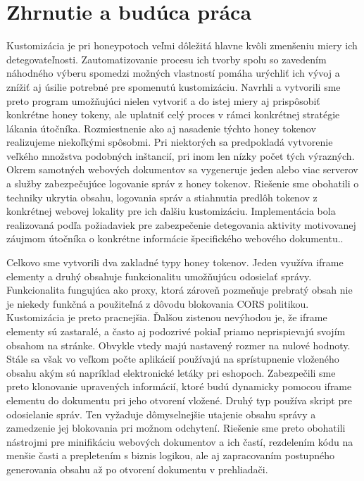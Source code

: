 \documentclass[conference, 11pt,slovak,a4paper,twoside]{IEEEtran}
\begin{document}
\section{Zhrnutie a budúca práca} \label{conclusions}

Kustomizácia je pri honeypotoch veľmi dôležitá hlavne kvôli zmenšeniu miery ich detegovateľnosti. Zautomatizovanie procesu ich tvorby spolu so zavedením náhodného výberu spomedzi možných vlastností pomáha urýchliť ich vývoj a znížiť aj úsilie potrebné pre spomenutú kustomizáciu. Navrhli a vytvorili sme preto program umožňujúci nielen vytvoriť a do istej miery aj prispôsobiť konkrétne honey tokeny, ale uplatniť celý proces v rámci konkrétnej stratégie lákania útočníka. Rozmiestnenie ako aj nasadenie týchto honey tokenov realizujeme niekoľkými spôsobmi. Pri niektorých sa predpokladá vytvorenie veľkého množstva podobných inštancií, pri inom len nízky počet tých výrazných. Okrem samotných webových dokumentov sa vygeneruje jeden alebo viac serverov a služby zabezpečujúce logovanie správ z honey tokenov. Riešenie sme obohatili o techniky ukrytia obsahu, logovania správ a stiahnutia predlôh tokenov z konkrétnej webovej lokality pre ich ďalšiu kustomizáciu. Implementácia bola realizovaná podľa požiadaviek pre zabezpečenie detegovania aktivity motivovanej záujmom útočníka o konkrétne informácie špecifického webového dokumentu..

Celkovo sme vytvorili dva zakladné typy honey tokenov. Jeden využíva iframe elementy a druhý obsahuje funkcionalitu umožňujúcu odosielať správy. Funkcionalita fungujúca ako proxy, ktorá zároveň pozmeňuje prebratý obsah nie je niekedy funkčná a použiteľná z dôvodu blokovania CORS politikou. Kustomizácia je preto pracnejšia. Ďalšou zistenou nevýhodou je, že iframe elementy sú zastaralé, a často aj podozrivé pokiaľ priamo neprispievajú svojím obsahom na stránke. Obvykle vtedy majú nastavený rozmer na nulové hodnoty. Stále sa však vo veľkom počte aplikácií používajú na sprístupnenie vloženého obsahu akým sú napríklad elektronické letáky pri eshopoch. Zabezpečili sme preto klonovanie upravených informácií, ktoré budú dynamicky pomocou iframe elementu do dokumentu pri jeho otvorení vložené. Druhý typ používa skript pre odosielanie správ. Ten vyžaduje dômyselnejšie utajenie obsahu správy a zamedzenie jej blokovania pri možnom odchytení. Riešenie sme preto obohatili nástrojmi pre minifikáciu webových dokumentov a ich častí, rezdelením kódu na menšie časti a prepletením s biznis logikou, ale aj zapracovaním postupného generovania obsahu až po otvorení dokumentu v prehliadači.
\end{document}
